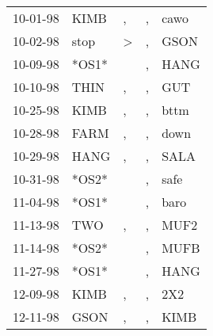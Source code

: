 \begin{supertabular}{p{0.07\textwidth}p{0.06\textwidth}p{0.02\textwidth}p{0.02\textwidth}p{0.06\textwidth}}
          10-01-98\textsuperscript{} &           KIMB\textsuperscript{} &                , &                , &           cawo\textsuperscript{} \\
          10-02-98\textsuperscript{} &           stop\textsuperscript{} &     \textgreater &                , &           GSON\textsuperscript{} \\
          10-09-98\textsuperscript{} &                            *OS1* &                  &                , &           HANG\textsuperscript{} \\
          10-10-98\textsuperscript{} &           THIN\textsuperscript{} &                , &                , &            GUT\textsuperscript{} \\
          10-25-98\textsuperscript{} &           KIMB\textsuperscript{} &                , &                , &           bttm\textsuperscript{} \\
          10-28-98\textsuperscript{} &           FARM\textsuperscript{} &                , &                , &           down\textsuperscript{} \\
          10-29-98\textsuperscript{} &           HANG\textsuperscript{} &                , &                , &           SALA\textsuperscript{} \\
          10-31-98\textsuperscript{} &                            *OS2* &                  &                , &           safe\textsuperscript{} \\
          11-04-98\textsuperscript{} &                            *OS1* &                  &                , &           baro\textsuperscript{} \\
          11-13-98\textsuperscript{} &            TWO\textsuperscript{} &                , &                , &           MUF2\textsuperscript{} \\
          11-14-98\textsuperscript{} &                            *OS2* &                  &                , &           MUFB\textsuperscript{} \\
          11-27-98\textsuperscript{} &                            *OS1* &                  &                , &           HANG\textsuperscript{} \\
          12-09-98\textsuperscript{} &           KIMB\textsuperscript{} &                , &                , &            2X2\textsuperscript{} \\
          12-11-98\textsuperscript{} &           GSON\textsuperscript{} &                , &                , &           KIMB\textsuperscript{} \\

\end{supertabular}
